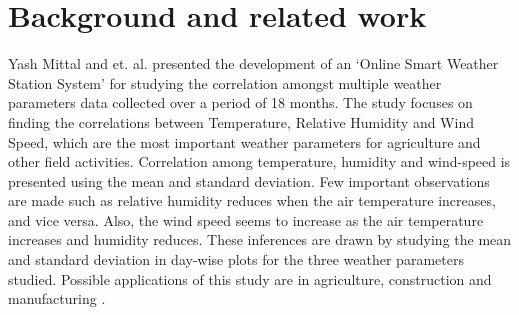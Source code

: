 \section{Background and related work}
\label{sec:background}
Yash Mittal and et. al. presented the development of an ‘Online Smart Weather
Station System’ for studying the correlation amongst multiple weather parameters
data collected over a period of 18 months. The study focuses on finding the
correlations between Temperature, Relative Humidity and Wind Speed, which are
the most important weather parameters for agriculture and other field activities.
Correlation among temperature, humidity and wind-speed is presented using the mean
and standard deviation. Few important observations are made such as relative humidity
reduces when the air temperature increases, and vice versa. Also, the wind
speed seems to increase as the air temperature increases and humidity reduces.
These inferences are drawn by studying the mean and standard deviation in
day-wise plots for the three weather parameters studied. Possible
applications of this study are in agriculture, construction and manufacturing \cite{7443621}. 

